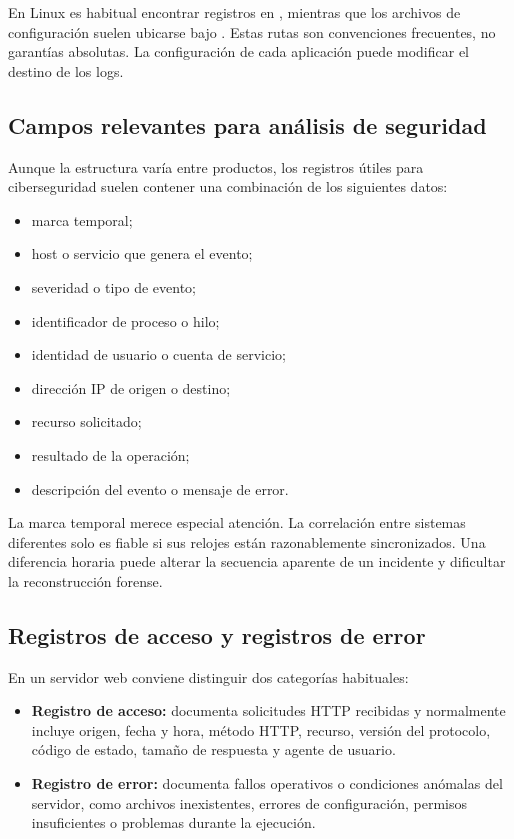\documentclass[11pt,a4paper]{article}
\newcommand{\ruta}[1]{\path{#1}}
\begin{document}
En Linux es habitual encontrar registros en \ruta{/var/log}, mientras que los archivos de configuración suelen ubicarse bajo \ruta{/etc}. Estas rutas son convenciones frecuentes, no garantías absolutas. La configuración de cada aplicación puede modificar el destino de los logs.

\subsection{Campos relevantes para análisis de seguridad}
Aunque la estructura varía entre productos, los registros útiles para ciberseguridad suelen contener una combinación de los siguientes datos:
\begin{itemize}
    \item marca temporal;
    \item host o servicio que genera el evento;
    \item severidad o tipo de evento;
    \item identificador de proceso o hilo;
    \item identidad de usuario o cuenta de servicio;
    \item dirección IP de origen o destino;
    \item recurso solicitado;
    \item resultado de la operación;
    \item descripción del evento o mensaje de error.
\end{itemize}

La marca temporal merece especial atención. La correlación entre sistemas diferentes solo es fiable si sus relojes están razonablemente sincronizados. Una diferencia horaria puede alterar la secuencia aparente de un incidente y dificultar la reconstrucción forense.

\subsection{Registros de acceso y registros de error}
En un servidor web conviene distinguir dos categorías habituales:
\begin{itemize}
    \item \textbf{Registro de acceso:} documenta solicitudes HTTP recibidas y normalmente incluye origen, fecha y hora, método HTTP, recurso, versión del protocolo, código de estado, tamaño de respuesta y agente de usuario.
    \item \textbf{Registro de error:} documenta fallos operativos o condiciones anómalas del servidor, como archivos inexistentes, errores de configuración, permisos insuficientes o problemas durante la ejecución.
\end{itemize}
\end{document}
